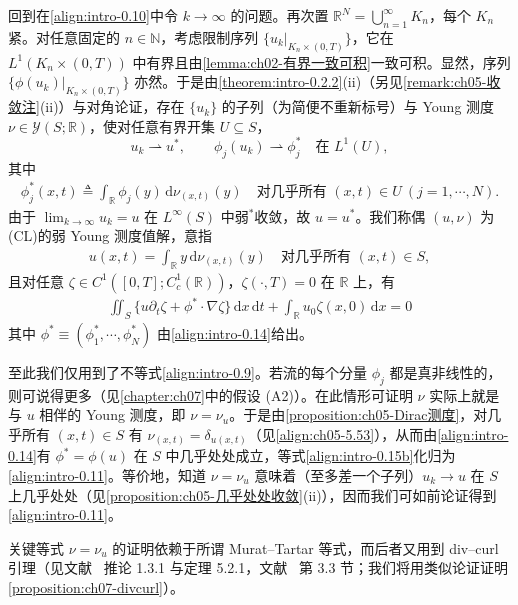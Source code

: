 \documentclass[../main.tex]{subfiles}
\begin{document}
回到在\eqref{align:intro-0.10}中令 $k\to\infty$ 的问题。再次置 $\mathbb{R}^N=\bigcup_{n=1}^\infty K_n$，每个 $K_n$ 紧。对任意固定的 $n\in\mathbb{N}$，考虑限制序列 $\{u_k|_{K_n\times(0,T)}\}$，它在 $L^1(K_n\times(0,T))$ 中有界且由\cref{lemma:ch02-有界一致可积}一致可积。显然，序列 $\{\phi(u_k)|_{K_n\times(0,T)}\}$ 亦然。于是由\cref{theorem:intro-0.2.2}(ii)（另见\cref{remark:ch05-收敛注}(ii)）与对角论证，存在 $\{u_k\}$ 的子列（为简便不重新标号）与 Young 测度 $\nu\in\mathcal{Y}(S;\mathbb{R})$，使对任意有界开集 $U\subseteq S$，
\[
u_k\rightharpoonup u^*,\qquad
\phi_j(u_k)\rightharpoonup\phi_j^* \quad \text{在 }L^1(U),
\]
其中
\begin{align}
\phi_j^*(x,t) \triangleq  \int_{\mathbb{R}}\phi_j(y)\,\mathrm{d}\nu_{(x,t)}(y)
\quad \text{对几乎所有 }(x,t)\in U\ (j=1,\cdots ,N). \label{align:intro-0.14}
\end{align}
由于 $\lim_{k\to\infty}u_k=u$ 在 $L^\infty(S)$ 中弱$^*$收敛，故 $u=u^*$。我们称偶 $(u,\nu)$ 为(CL)的弱 Young 测度值解，意指
\begin{align}
u(x,t) = \int_{\mathbb{R}}y\,\mathrm{d}\nu_{(x,t)}(y)
\quad \text{对几乎所有 }(x,t)\in S, \label{align:intro-0.15a}
\end{align}
且对任意 $\zeta\in C^1([0,T];C^1_c(\mathbb{R}))$，$\zeta(\cdot,T)=0$ 在 $\mathbb{R}$ 上，有
\begin{align}
\iint_S\{u\partial_t\zeta + \phi^*\cdot\nabla\zeta\}\,\mathrm{d}x\,\mathrm{d}t
+ \int_{\mathbb{R}}u_0\zeta(x,0)\,\mathrm{d}x = 0 \label{align:intro-0.15b}
\end{align}
其中 $\phi^*\equiv(\phi^*_1,\cdots ,\phi^*_N)$ 由\eqref{align:intro-0.14}给出。

至此我们仅用到了不等式\eqref{align:intro-0.9}。若流的每个分量 $\phi_j$ 都是真非线性的，则可说得更多（见\cref{chapter:ch07}中的假设 (A2)）。在此情形可证明 $\nu$ 实际上就是与 $u$ 相伴的 Young 测度，即 $\nu=\nu_u$。于是由\cref{proposition:ch05-Dirac测度}，对几乎所有 $(x,t)\in S$ 有 $\nu_{(x,t)}=\delta_{u(x,t)}$（见\eqref{align:ch05-5.53}），从而由\eqref{align:intro-0.14}有 $\phi^*=\phi(u)$ 在 $S$ 中几乎处处成立，等式\eqref{align:intro-0.15b}化归为\eqref{align:intro-0.11}。等价地，知道 $\nu=\nu_u$ 意味着（至多差一个子列）$u_k\to u$ 在 $S$ 上几乎处处（见\cref{proposition:ch05-几乎处处收敛}(ii)），因而我们可如前论证得到\eqref{align:intro-0.11}。

关键等式 $\nu=\nu_u$ 的证明依赖于所谓 Murat--Tartar 等式，而后者又用到 div--curl 引理（见文献~\cite{ref46} 推论 1.3.1 与定理 5.2.1，文献~\cite{ref68} 第 3.3 节；我们将用类似论证证明\cref{proposition:ch07-divcurl}）。
\end{document}
